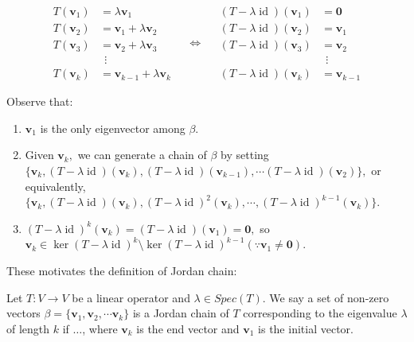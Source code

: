 $$
\begin{aligned}
T(\mathbf{v}_1) &= \lambda \mathbf{v}_1 \\
T(\mathbf{v}_2) &= \mathbf{v}_1 + \lambda \mathbf{v}_2 \\
T(\mathbf{v}_3) &= \mathbf{v}_2 + \lambda \mathbf{v}_3 \\
&\ \ \vdots \\
T(\mathbf{v}_k) &= \mathbf{v}_{k-1} + \lambda \mathbf{v}_k
\end{aligned}
\quad
\Longleftrightarrow
\quad
\begin{aligned}
(T - \lambda \operatorname{id})(\mathbf{v}_1) &= \mathbf{0} \\
(T - \lambda \operatorname{id})(\mathbf{v}_2) &= \mathbf{v}_1 \\
(T - \lambda \operatorname{id})(\mathbf{v}_3) &= \mathbf{v}_2 \\
&\ \ \vdots \\
(T - \lambda \operatorname{id})(\mathbf{v}_k) &= \mathbf{v}_{k-1}
\end{aligned}
$$

Observe that:
\begin{enumerate}
    \item $\mathbf{v}_1$ is the only eigenvector among $\beta.$
    \item Given $\mathbf{v}_k,$ we can generate a chain of $\beta$ by setting $\Big\{\mathbf{v}_k, (T-\lambda \operatorname{id})(\mathbf{v}_k), (T-\lambda \operatorname{id})(\mathbf{v}_{k-1}),\cdots(T-\lambda \operatorname{id})(\mathbf{v}_2)\Big\},$
    or equivalently,\\
     $\Big\{\mathbf{v}_k, (T-\lambda \operatorname{id})(\mathbf{v}_k), (T-\lambda \operatorname{id})^2(\mathbf{v}_{k}),\cdots,(T-\lambda \operatorname{id})^{k-1}(\mathbf{v}_{k})\Big\}.$
    \item $(T-\lambda \operatorname{id})^{k}(\mathbf{v}_{k})=(T-\lambda \operatorname{id})(\mathbf{v}_{1})=\mathbf{0},$ so $\mathbf{v}_k\in \ker(T-\lambda\operatorname{id})^k\setminus\ker(T-\lambda\operatorname{id})^{k-1} (\because \mathbf{v}_1\ne\mathbf{0}).$
\end{enumerate}

These motivates the definition of Jordan chain:
\begin{definition}
    Let $T:V\to V$ be a linear operator and $\lambda\in Spec(T).$
    We say a set of non-zero vectors $\beta=\{\mathbf{v}_1, \mathbf{v}_2,\cdots\mathbf{v}_k\}$ is a Jordan chain of $T$ corresponding to the eigenvalue $\lambda$ of length $k$ if $\dots$,
    where $\mathbf{v}_k$ is the end vector and $\mathbf{v}_1$ is the initial vector.
\end{definition}


